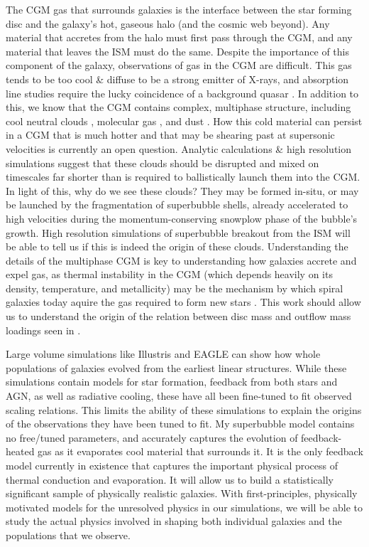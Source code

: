 The CGM gas that surrounds galaxies is the interface between the star forming
disc and the galaxy's hot, gaseous halo (and the cosmic web beyond).  Any
material that accretes from the halo must first pass through the CGM, and any
material that leaves the ISM must do the same.  Despite the importance
of this component of the galaxy, observations of gas in the CGM are difficult.
This gas tends to be too cool \& diffuse to be a strong emitter of X-rays, and
absorption line studies require the lucky coincidence of a background quasar
\citep{Weiner2009}.  In addition to this, we know that the CGM contains complex,
multiphase structure, including cool neutral clouds \citep{Wakker1997},
molecular gas \citep{Stark1984}, and dust .  How this cold material can persist in a
CGM that is much hotter and that may be shearing past at supersonic velocities
is currently an open question.  Analytic calculations \& high resolution
simulations suggest that these clouds should be disrupted and mixed on
timescales far shorter than is required to ballistically launch them into the
CGM.  In light of this, why do we see these clouds?  They may be formed in-situ,
or may be launched by the fragmentation of superbubble shells, already
accelerated to high velocities during the momentum-conserving snowplow phase of
the bubble's growth.  High resolution simulations of superbubble breakout from
the ISM will be able to tell us if this is indeed the origin of these clouds.
Understanding the details of the multiphase CGM is key to
understanding how galaxies accrete and expel gas, as thermal instability in the
CGM (which depends heavily on its density, temperature, and metallicity) may be
the mechanism by which spiral galaxies today aquire the gas required to
form new stars \citep{Marasco2012}.  This work should allow us to understand the
origin of the relation between disc mass and outflow mass loadings seen in
\citet{Keller2016a}.


Large volume simulations like Illustris \citep{Vogelsberger2014b} and EAGLE
\citep{Schaye2015} can show how whole populations of galaxies evolved from the
earliest linear structures.  While these simulations contain models for star
formation, feedback from both stars and AGN, as well as radiative cooling, these
have all been fine-tuned to fit observed scaling relations.  This limits the
ability of these simulations to explain the origins of the observations they
have been tuned to fit.  My superbubble model contains no free/tuned parameters,
and accurately captures the evolution of feedback-heated gas as it evaporates
cool material that surrounds it.  It is the only feedback model currently in
existence that captures the important physical process of thermal conduction and
evaporation.  It will allow us to build a statistically significant sample of
physically realistic galaxies.  With first-principles, physically motivated
models for the unresolved physics in our simulations, we will be able to study
the actual physics involved in shaping both individual galaxies and the
populations that we observe. 


